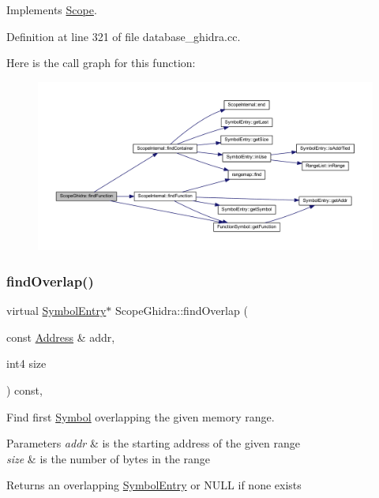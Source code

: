 Implements \mbox{\hyperlink{class_scope_a2c621196f6fdb4b8ce4ee1f3dc953107}{Scope}}.



Definition at line 321 of file database\+\_\+ghidra.\+cc.

Here is the call graph for this function\+:
\nopagebreak
\begin{figure}[H]
\begin{center}
\leavevmode
\includegraphics[width=350pt]{class_scope_ghidra_a8bc17a80d5b2bd69f7900be5b55a382a_cgraph}
\end{center}
\end{figure}
\mbox{\label{class_scope_ghidra_afb59d45c8fa404fe023e054b255d5a3d}} 
\subsubsection{\texorpdfstring{findOverlap()}{findOverlap()}}
{\footnotesize\ttfamily virtual \mbox{\hyperlink{class_symbol_entry}{Symbol\+Entry}}$\ast$ Scope\+Ghidra\+::find\+Overlap (\begin{DoxyParamCaption}\item[{const \mbox{\hyperlink{class_address}{Address}} \&}]{addr,  }\item[{int4}]{size }\end{DoxyParamCaption}) const\hspace{0.3cm}{\ttfamily [inline]}, {\ttfamily [virtual]}}



Find first \mbox{\hyperlink{class_symbol}{Symbol}} overlapping the given memory range. 


\begin{DoxyParams}{Parameters}
{\em addr} & is the starting address of the given range \\
\hline
{\em size} & is the number of bytes in the range \\
\hline
\end{DoxyParams}
\begin{DoxyReturn}{Returns}
an overlapping \mbox{\hyperlink{class_symbol_entry}{Symbol\+Entry}} or N\+U\+LL if none exists 
\end{DoxyReturn}


